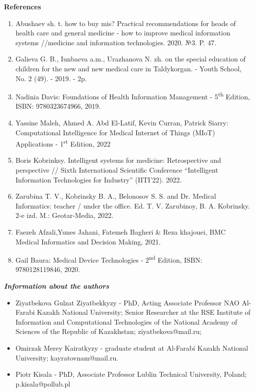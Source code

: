 \begin{center}
{\bfseries References}
\end{center}

\begin{enumerate}
\def\labelenumi{\arabic{enumi}.}
\item
  Abushaev sh. t. how to buy mis? Practical recommendations for heads of
  health care and general medicine - how to improve medical information
  systems //medicine and information technologies. 2020. №3. P. 47.
\item
  Galieva G. B., Iunbaeva a.m., Urazhanova N. zh. on the special
  education of children for the new and new medical care in Taldykorgan.
  - Youth School, No. 2 (49). - 2019. - 2p.
\item
  Nadinia Davis: Foundations of Health Information Management -
  5\textsuperscript{th} Edition, ISBN: 9780323674966, 2019.
\item
  Yassine Maleh, Ahmed A. Abd El-Latif, Kevin Curran, Patrick Siarry:
  Computational Intelligence for Medical Internet of Things (MIoT)
  Applications - 1\textsuperscript{st} Edition, 2022
\item
  Boris Kobrinksy. Intelligent systems for medicine: Retrospective and
  perspective // Sixth International Scientific Conference ``Intelligent
  Information Technologies for Industry'' (IITI'22). 2022.
\item
  Zarubina T. V., Kobrinsky B. A., Belonosov S. S. and Dr. Medical
  Informatics: teacher / under the office. Ed. T. V. Zarubinoy, B. A.
  Kobrinsky. 2-e izd. M.: Geotar-Media, 2022.
\item
  Faezeh Afzali,Yunes Jahani, Fatemeh Bagheri \& Reza khajouei, BMC
  Medical Informatics and Decision Making, 2021.
\item
  Gail Baura: Medical Device Technologies - 2\textsuperscript{nd}
  Edition, ISBN: 9780128119846, 2020.
\end{enumerate}

\emph{{\bfseries Information about the authors}}

\begin{itemize}
\item
Ziyatbekova Gulzat Ziyatbekkyzy - PhD, Acting Associate Professor NAO
Al-Farabi Kazakh National University; Senior Researcher at the RSE
Institute of Information and Computational Technologies of the National
Academy of Sciences of the Republic of Kazakhstan;
ziyatbekova@mail.ru;

\item
Omirzak Merey Kairatkyzy - graduate student at Al-Farabi Kazakh
National University; kayratovnam@mail.ru.

\item
Piotr Kisala - PhD, Associate Professor Lublin Technical University,
Poland; p.kisala@pollub.pl
\end{itemize}

